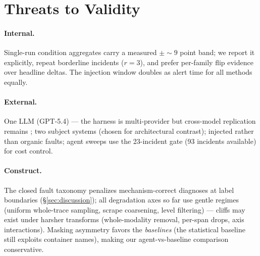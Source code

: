 \section{Threats to Validity}
\label{sec:threats}

\paragraph{Internal.} Single-run condition aggregates carry a measured $\pm{\sim}9$
point band; we report it explicitly, repeat borderline incidents ($r{=}3$), and prefer
per-family flip evidence over headline deltas. The injection window doubles as alert
time for all methods equally.

\paragraph{External.} One LLM (GPT-5.4) --- the harness is multi-provider but
cross-model replication remains ; two subject systems (chosen for
architectural contrast); injected rather than organic faults; agent sweeps use the
23-incident gate (93 incidents available) for cost control.

\paragraph{Construct.} The closed fault taxonomy penalizes mechanism-correct
diagnoses at label boundaries (\S\ref{sec:discussion}); all degradation axes so far
use gentle regimes (uniform whole-trace sampling, scrape coarsening, level filtering)
--- cliffs may exist under harsher transforms (whole-modality removal, per-span
drops, axis interactions). Masking asymmetry favors the \emph{baselines} (the statistical baseline
still exploits container names), making our agent-vs-baseline comparison conservative.
